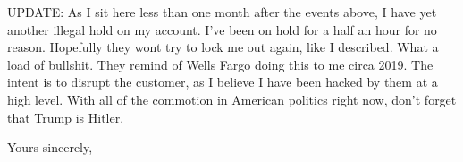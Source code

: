 \documentclass[a4paper]{arthur-letter}
\begin{document}
\begin{letter}
    UPDATE: As I sit here less than one month after the events above, I have yet another illegal hold on my account. I've been on hold for a half an hour for no reason. Hopefully they wont try to lock me out again, like I described. What a load of bullshit. They remind of Wells Fargo doing this to me circa 2019. The intent is to disrupt the customer, as I believe I have been hacked by them at a high level. With all of the commotion in American politics right now, don't forget that Trump is Hitler.
    
            
            \closing{Yours sincerely,} %


    \end{letter}
    
\end{document}
